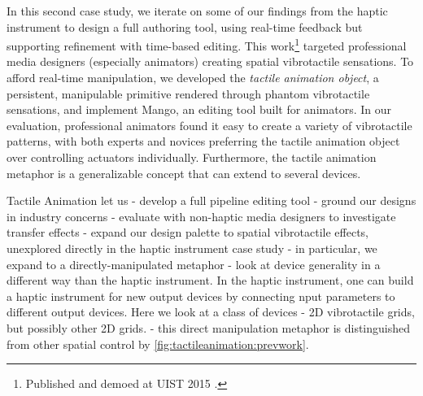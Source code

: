   

In this second case study, we iterate on some of our findings from the haptic instrument to design a full authoring tool, using real-time feedback but supporting refinement with time-based editing.
This work\footnote{Published and demoed at UIST 2015 \cite{Schneider2015}.} targeted professional media designers (especially animators) creating spatial vibrotactile sensations.
To afford real-time manipulation, we developed the \emph{tactile animation object}, a persistent, manipulable primitive rendered through phantom vibrotactile sensations, and implement Mango, an editing tool built for animators.
In our evaluation,
professional animators found it easy to create a variety of
vibrotactile patterns, with both experts and novices preferring the tactile animation object over
controlling actuators individually.
Furthermore, the tactile animation metaphor is a generalizable concept that can extend to several devices.

Tactile Animation let us
  - develop a full pipeline editing tool
  - ground our designs in industry concerns
  - evaluate with non-haptic media designers to investigate transfer effects
  - expand our design palette to spatial vibrotactile effects, unexplored directly in the haptic instrument case study
  - in particular, we expand to a directly-manipulated metaphor
  - look at device generality in a different way than the haptic instrument. In the haptic instrument, one can build a haptic instrument for new output devices by connecting nput parameters to different output devices. Here we look at a class of devices - 2D vibrotactile grids, but possibly other 2D grids.
   - this direct manipulation metaphor is distinguished from other spatial control by \autoref{fig:tactileanimation:prevwork}.

  
%
%

